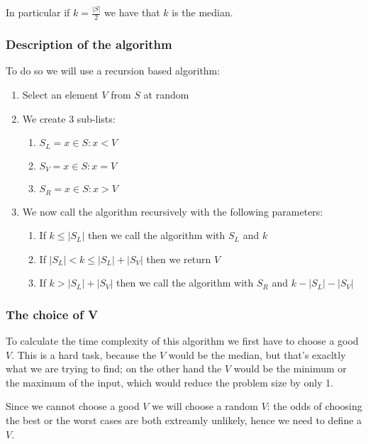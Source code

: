 \documentclass[10pt]{extarticle}
\begin{document}
In particular if $k = \frac{|S|}{2}$ we have that $k$ is the median.

\subsubsection{Description of the algorithm}

To do so we will use a recursion based algorithm:

\begin{enumerate}
    \item Select an element $V$ from $S$ at random
    \item We create 3 sub-lists:
          \begin{enumerate}
              \item $S_L = {x \in S : x < V}$
              \item $S_V = {x \in S : x = V}$
              \item $S_R = {x \in S : x > V}$
          \end{enumerate}
    \item We now call the algorithm recursively with the following parameters:
          \begin{enumerate}
              \item If $k \le |S_L|$ then we call the algorithm with $S_L$ and $k$
              \item If $|S_L| < k \leq |S_L| + |S_V|$ then we return $V$
              \item If $k > |S_L| + |S_V|$ then we call the algorithm with $S_R$ and $k - |S_L| - |S_V|$
          \end{enumerate}
\end{enumerate}

\subsubsection{The choice of V}

To calculate the time complexity of this algorithm we first have to choose a good $V$.
This is a hard task, because the  $V$ would be the median, but that's exacltly what we are trying to find;
on the other hand the  $V$ would be the minimum or the maximum of the input, which would reduce the problem size by only 1.

Since we cannot choose a good $V$ we will choose a random $V$:
the odds of choosing the best or the worst cases are both extreamly unlikely,
hence we need to define a  $V$.
\end{document}
